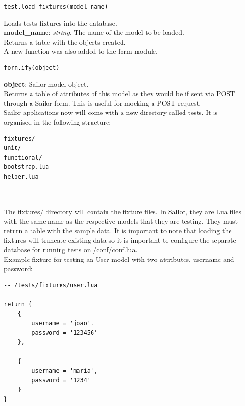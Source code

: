 \documentclass{article}
\begin{document}
\begin{lstlisting}[frame=single]
test.load_fixtures(model_name)
\end{lstlisting}
Loads tests fixtures into the database.\\
\textbf{model\_name}: \textit{string}. The name of the model to be loaded.\\
Returns a table with the objects created.\\

A new function was also added to the form module.
\begin{lstlisting}[frame=single]
form.ify(object)
\end{lstlisting}
\textbf{object}: Sailor model object.\\
Returns a table of attributes of this model as they would be if sent via POST through a Sailor form. This is useful for mocking a POST request.  \\

Sailor applications now will come with a new directory called tests. It is organised in the following structure:\\

\begin{lstlisting}[frame=single]
fixtures/
unit/
functional/
bootstrap.lua
helper.lua
\end{lstlisting}\\\\

The fixtures/ directory will contain the fixture files. In Sailor, they are Lua files with the same name as the respective models that they are testing. They must return a table with the sample data. It is important to note that loading the fixtures will truncate existing data so it is important to configure the separate database for running tests on /conf/conf.lua.\\

Example fixture for testing an User model with two attributes, username and password:\\

\begin{lstlisting}[frame=single]
-- /tests/fixtures/user.lua

return {
    {
        username = 'joao',
        password = '123456'
    },

    {
        username = 'maria',
        password = '1234'
    }
}
\end{lstlisting}\\\\
\end{document}
